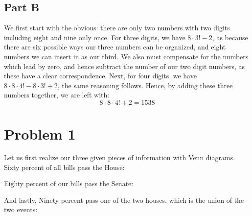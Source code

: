 \documentclass[12pt,a5paper]{article}
\begin{document}
\subsection*{Part B}
We first start with the obvious: there are only two numbers with two digits including eight and nine only once. For three digits, we have $8 \cdot 3! - 2$, as because there are six possible ways our three numbers can be organized, and eight numbers we can insert in as our third. We also must compensate for the numbers which lead by zero, and hence subtract the number of our two digit numbers, as these have a clear correspondence. Next, for four digits, we have $8 \cdot 8 \cdot 4! -  8 \cdot 3! + 2$, the same reasoning follows. Hence, by adding these three numbers together, we are left with:
\[
8 \cdot 8 \cdot 4! + 2 = 1538
\]


\section*{Problem 1}

Let us first realize our three given pieces of information with Venn diagrams. Sixty percent of all bills pass the House:

\begin{center}
\end{center}

Eighty percent of our bills pass the Senate:

\begin{center}
\end{center}

And lastly, Ninety percent pass one of the two houses, which is the union of the two events:
\begin{center}
\end{center}
\end{document}
